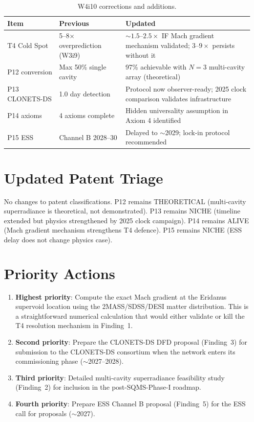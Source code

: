 \documentclass[11pt]{article}
\begin{document}
\begin{table}[H]
\centering
\caption{W4i10 corrections and additions.}
\begin{tabular}{lp{5cm}p{5cm}}
\toprule
\textbf{Item} & \textbf{Previous} & \textbf{Updated} \\
\midrule
T4 Cold Spot & 5--8$\times$ overprediction (W3i9) &
  $\sim 1.5$--$2.5\times$ IF Mach gradient mechanism validated;
  $3$--$9\times$ persists without it \\
P12 conversion & Max 50\% single cavity & 97\% achievable with $N = 3$
  multi-cavity array (theoretical) \\
P13 CLONETS-DS & 1.0 day detection & Protocol now observer-ready; 2025
  clock comparison validates infrastructure \\
P14 axioms & 4 axioms complete & Hidden universality assumption in
  Axiom 4 identified \\
P15 ESS & Channel B 2028--30 & Delayed to $\sim$2029; lock-in
  protocol recommended \\
\bottomrule
\end{tabular}
\end{table}

\section{Updated Patent Triage}

No changes to patent classifications. P12 remains THEORETICAL (multi-cavity
superradiance is theoretical, not demonstrated). P13 remains NICHE
(timeline extended but physics strengthened by 2025 clock campaign).
P14 remains ALIVE (Mach gradient mechanism strengthens T4 defence).
P15 remains NICHE (ESS delay does not change physics case).

\section{Priority Actions}

\begin{enumerate}
\item \textbf{Highest priority}: Compute the exact Mach gradient at the
  Eridanus supervoid location using the 2MASS/SDSS/DESI matter
  distribution. This is a straightforward numerical calculation that
  would either validate or kill the T4 resolution mechanism in Finding~1.

\item \textbf{Second priority}: Prepare the CLONETS-DS DFD proposal
  (Finding~3) for submission to the CLONETS-DS consortium when the
  network enters its commissioning phase ($\sim$2027--2028).

\item \textbf{Third priority}: Detailed multi-cavity superradiance
  feasibility study (Finding~2) for inclusion in the post-SQMS-Phase-I
  roadmap.

\item \textbf{Fourth priority}: Prepare ESS Channel B proposal
  (Finding~5) for the ESS call for proposals ($\sim$2027).
\end{enumerate}
\end{document}
